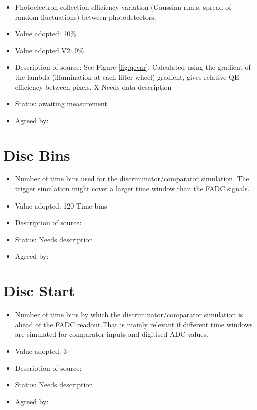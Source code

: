 \documentclass[GCT,short]{gct}
\begin{document}
\begin{itemize}
\item Photoelectron collection efficiency variation (Gaussian r.m.s. spread of random fluctuations) between photodetectors.
\item Value adopted: 10\%
\item Value adopted V2: 9\%
\item Description of source: See Figure \ref{fig:qevar}. Calculated using the gradient of the lambda (illumination at each filter wheel) gradient, gives relative QE efficiency between pixels. \color{red} X Needs data description \color{black}
\item Status:\color{orange} awaiting measurement\color{black}
\item Agreed by: 
\end{itemize}

\section{Disc Bins }
\begin{itemize}
\item Number of time bins used for the discriminator/comparator simulation. The trigger simulation might cover a larger time window than the FADC signals.
\item Value adopted: 120 Time bins
\item Description of source: 
\item Status: \color{red} Needs description \color{black}
\item Agreed by: 
\end{itemize}

\section{Disc Start}
\begin{itemize}
\item Number of time bins by which the discriminator/comparator simulation is ahead of the FADC readout.That is mainly relevant if different time windows are simulated for comparator inputs and digitised ADC values.
\item Value adopted: 3
\item Description of source: 
\item Status: \color{red} Needs description \color{black}
\item Agreed by: 
\end{itemize}
\end{document}
